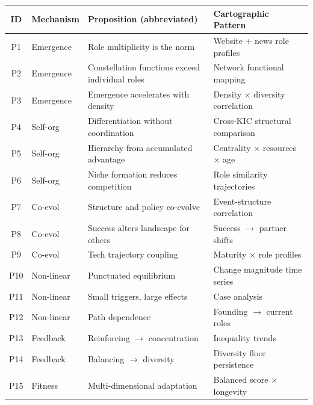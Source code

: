 \documentclass[../main.tex]{subfiles}
\begin{document}
\begin{center}
\tableminimal
\scriptsize
\begin{tabular}{@{}clp{5cm}p{4cm}@{}}
\toprule
\textbf{ID} & \textbf{Mechanism} & \textbf{Proposition (abbreviated)} & \textbf{Cartographic Pattern} \\
\midrule
P1 & Emergence & Role multiplicity is the norm & Website + news role profiles \\
P2 & Emergence & Constellation functions exceed individual roles & Network functional mapping \\
P3 & Emergence & Emergence accelerates with density & Density $\times$ diversity correlation \\
\addlinespace
P4 & Self-org & Differentiation without coordination & Cross-KIC structural comparison \\
P5 & Self-org & Hierarchy from accumulated advantage & Centrality $\times$ resources $\times$ age \\
P6 & Self-org & Niche formation reduces competition & Role similarity trajectories \\
\addlinespace
P7 & Co-evol & Structure and policy co-evolve & Event-structure correlation \\
P8 & Co-evol & Success alters landscape for others & Success $\rightarrow$ partner shifts \\
P9 & Co-evol & Tech trajectory coupling & Maturity $\times$ role profiles \\
\addlinespace
P10 & Non-linear & Punctuated equilibrium & Change magnitude time series \\
P11 & Non-linear & Small triggers, large effects & Case analysis \\
P12 & Non-linear & Path dependence & Founding $\rightarrow$ current roles \\
\addlinespace
P13 & Feedback & Reinforcing $\rightarrow$ concentration & Inequality trends \\
P14 & Feedback & Balancing $\rightarrow$ diversity & Diversity floor persistence \\
P15 & Fitness & Multi-dimensional adaptation & Balanced score $\times$ longevity \\
\bottomrule
\end{tabular}
\end{center}


\end{document}
